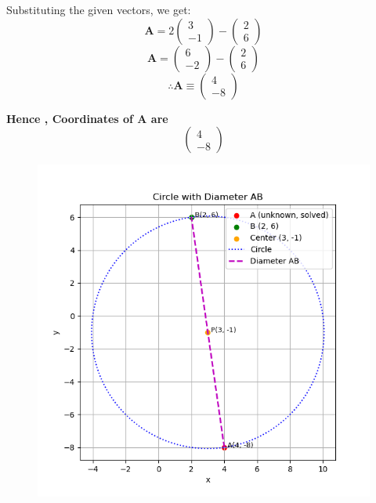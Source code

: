 \documentclass[journal]{IEEEtran}
\numberwithin{equation}{enumi}
\numberwithin{figure}{enumi}
\begin{document}
Substituting the given vectors, we get:
\[
\mathbf{A} = 2 \begin{pmatrix} 3 \\ -1 \end{pmatrix} - \begin{pmatrix} 2 \\ 6 \end{pmatrix} \tag{0.3}
\]
\[
\mathbf{A} = \begin{pmatrix} 6 \\ -2 \end{pmatrix} - \begin{pmatrix} 2 \\ 6 \end{pmatrix} \tag{0.4}
\]
\[
\therefore \mathbf{A} \equiv \begin{pmatrix} 4 \\ -8 \end{pmatrix}
\]

\textbf{Hence , Coordinates of A are } 
\[
\begin{pmatrix} 4 \\ -8 \end{pmatrix}
\]



\begin{figure}[H]
    \centering
 \includegraphics[width=0.5\linewidth]{figs/Fig1.png}
    \caption{}
    \label{fig:placeholder}
\end{figure}
\end{document}

